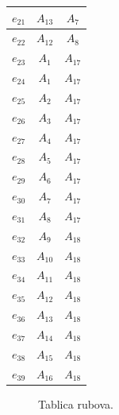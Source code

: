 \documentclass[a4paper,12pt]{article}
\begin{document}
\begin{center}
\begin{tabular}{||c | c | c ||}
         \hline
         $e_{21}$ & $A_{13}$ & $A_{7}$  \\
         \hline
         $e_{22}$ & $A_{12 }$& $A_{8}$ \\ 
         \hline
         $e_{23}$ & $A_{1}$ & $A_{17}$  \\
         \hline
         $e_{24}$ & $A_{1}$ & $A_{17}$   \\
         \hline
         $e_{25}$ & $A_{2}$ & $A_{17}$   \\
         \hline
         $e_{26}$ & $A_{3}$  & $A_{17}$  \\
         \hline
         $e_{27}$ & $A_{4}$ & $A_{17}$  \\ 
         \hline
         $e_{28}$& $A_{5}$ & $A_{17}$  \\
         \hline
         $e_{29}$ & $A_{6}$ & $A_{17}$  \\
         \hline
         $e_{30}$ & $A_{7}$ & $A_{17}$  \\
         \hline
         $e_{31}$ & $A_{8}$ & $A_{17}$  \\ 
         \hline
         $e_{32}$ & $A_{9}$ & $A_{18}$  \\
         \hline
         $e_{33}$ & $A_{10}$ & $A_{18}$   \\
         \hline
         $e_{34}$ & $A_{11}$ & $A_{18}$   \\
         \hline
         $e_{35}$ & $A_{12}$  &$A_{18}$  \\
         \hline
         $e_{36}$ & $A_{13}$ &$A_{18}$  \\ 
         \hline
         $e_{37}$& $A_{14}$ & $A_{18}$  \\
         \hline
         $e_{38}$ & $A_{15}$ & $A_{18}$   \\
         \hline
         $e_{39}$ & $A_{16}$ &$A_{18}$ \\[1ex] 
         \hline
        \end{tabular}
        \end{center}
        \begin{figure}[ht]
            \centering
            \caption{Tablica rubova.}
        \end{figure}
\end{document}
